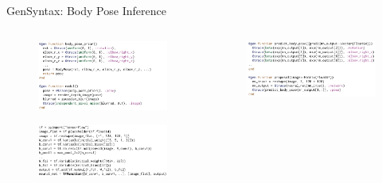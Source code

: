 \documentclass[AERbeamer%
              ,optEnglish%
              ,optBiber%
              ,optBibstyleAlphabetic%
              ,optBeamerClassicFormat%
              ]{AERlatex}%
\begin{document}
\begin{frame}[c]{Gen}{Syntax: Body Pose Inference}
    \centering
    \begin{columns}[T]
        \begin{column}{0.48\textwidth}
            \centering
            \begin{figure}
                \centering
                \includegraphics[width=\textwidth]{GenModelDML.png}
            \end{figure}
            \begin{figure}
                \centering
                \includegraphics[width=\textwidth]{GenBodyPoseTML.png}
            \end{figure}
        \end{column}
        \begin{column}{0.48\textwidth}
            \centering
            \begin{figure}
                \centering
                \includegraphics[width=\textwidth]{GenBodyPoseProposalDML.png}

\end{figure}
\end{column}
\end{columns}
\end{frame}
\end{document}

